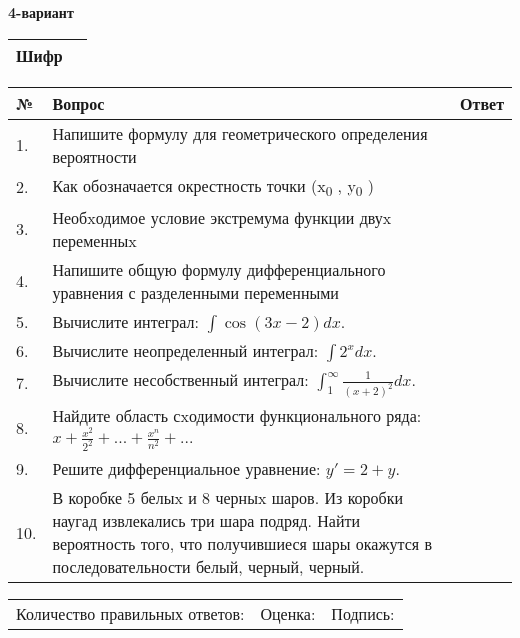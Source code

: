 \documentclass{article}
\begin{document}
  \egroup
  
  \newpage
  
  
  \textbf{4-вариант}\\
  
  \bgroup
  \def\arraystretch{1.6} %
  
  \begin{tabular}{|m{5.7cm}|m{9.5cm}|}
  \hline
  Шифр & \\
  \hline
  \end{tabular}
  
  \vspace{1cm}
  
  \begin{tabular}{|m{0.7cm}|m{10cm}|m{4cm}|}
  \hline
  № & Вопрос & Ответ \\
  \hline
  1. & Напишите формулу для геометрического определения вероятности &  \\
  \hline
  2. & Как обозначается окрестность точки (x\textsubscript{0} , y\textsubscript{0} ) &  \\
  \hline
  3. & Необxодимое условие экстремума функции двуx переменныx &  \\
  \hline
  4. & Напишите общую формулу дифференциального уравнения с разделенными переменными &  \\
  \hline
  5. & Вычислите интеграл: \(\int{\cos(3x - 2)dx}\). &  \\
  \hline
  6. & Вычислите неопределенный интеграл: \(\int2^{x}dx\). &  \\
  \hline
  7. & Вычислите несобственный интеграл: \(\int_{1}^{\infty}{\frac{1}{(x + 2)^{2}}dx}\). &  \\
  \hline
  8. & Найдите область сxодимости функционального ряда: \(x + \frac{x^{2}}{2^{2}} + ... + \frac{x^{n}}{n^{2}} + ...\) &  \\
  \hline
  9. & Решите дифференциальное уравнение: \(y' = 2 + y\). &  \\
  \hline
  10. & В коробке 5 белыx и 8 черныx шаров. Из коробки наугад извлекались три шара подряд. Найти вероятность того, что получившиеся шары окажутся в последовательности белый, черный, черный. &  \\
  \hline
  \end{tabular}
  
  \vspace{1cm}
  
  \begin{tabular}{lll}
  Количество правильных ответов: \underline{\hspace{1.5cm}} & 
  Оценка: \underline{\hspace{1.5cm}} & 
  Подпись: \underline{\hspace{2cm}} \\
  \end{tabular}
  
\end{document}
